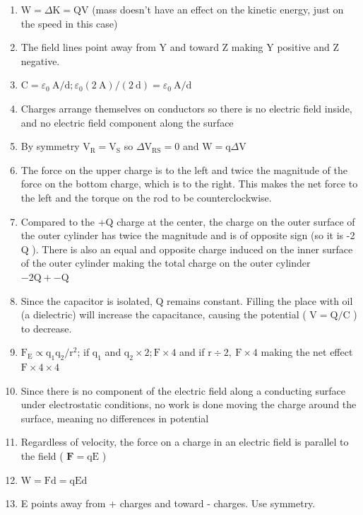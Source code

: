 \begin{enumerate}
\begin{enumerate}
  \item $\mathrm{W}=\Delta \mathrm{K}=\mathrm{QV}$ (mass doesn't have an effect on the kinetic energy, just on the speed in this case)
  \item The field lines point away from Y and toward Z making Y positive and Z negative.
  \item $\mathrm{C}=\varepsilon_{0} \mathrm{~A} / \mathrm{d} ; \varepsilon_{0}(2 \mathrm{~A}) /(2 \mathrm{~d})=\varepsilon_{0} \mathrm{~A} / \mathrm{d}$
  \item Charges arrange themselves on conductors so there is no electric field inside, and no electric field component along the surface
  \item By symmetry $\mathrm{V}_{\mathrm{R}}=\mathrm{V}_{\mathrm{S}}$ so $\Delta \mathrm{V}_{\mathrm{RS}}=0$ and $\mathrm{W}=\mathrm{q} \Delta \mathrm{V}$
  \item The force on the upper charge is to the left and twice the magnitude of the force on the bottom charge, which is to the right. This makes the net force to the left and the torque on the rod to be counterclockwise.
  \item Compared to the +Q charge at the center, the charge on the outer surface of the outer cylinder has twice the magnitude and is of opposite sign (so it is -2 Q ). There is also an equal and opposite charge induced on the inner surface of the outer cylinder making the total charge on the outer cylinder $-2 \mathrm{Q}+-\mathrm{Q}$
  \item Since the capacitor is isolated, Q remains constant. Filling the place with oil (a dielectric) will increase the capacitance, causing the potential ( $\mathrm{V}=\mathrm{Q} / \mathrm{C}$ ) to decrease.
  \item $\mathrm{F}_{\mathrm{E}} \propto \mathrm{q}_{1} \mathrm{q}_{2} / \mathrm{r}^{2}$; if $\mathrm{q}_{1}$ and $\mathrm{q}_{2} \times 2 ; \mathrm{F} \times 4$ and if $\mathrm{r} \div 2, \mathrm{~F} \times 4$ making the net effect $\mathrm{F} \times 4 \times 4$
  \item Since there is no component of the electric field along a conducting surface under electrostatic conditions, no work is done moving the charge around the surface, meaning no differences in potential
  \item Regardless of velocity, the force on a charge in an electric field is parallel to the field ( $\mathbf{F}=\mathrm{qE}$ )
  \item $\mathrm{W}=\mathrm{Fd}=\mathrm{qEd}$
  \item E points away from + charges and toward - charges. Use symmetry.

\end{enumerate}
\end{enumerate}
